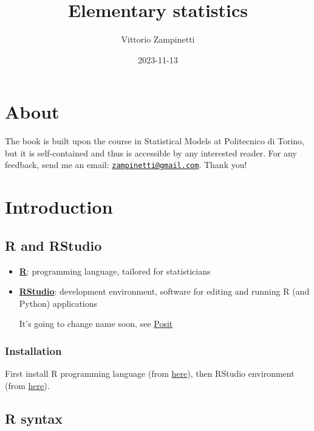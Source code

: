 \documentclass[
  oneside]{book}
\title{Elementary statistics}
\author{Vittorio Zampinetti}
\date{2023-11-13}
\begin{document}
\maketitle

{
\setcounter{tocdepth}{2}
\tableofcontents
}
\hypertarget{about}{%
\chapter*{About}\label{about}}

The book is built upon the course in Statistical Models at
Politecnico di Torino, but it is self-contained and thus is
accessible by any interested reader. For any feedback, send me
an email: \href{mailto:zampinetti@gmail.com}{\nolinkurl{zampinetti@gmail.com}}. Thank you!

\hypertarget{introduction}{%
\chapter{Introduction}\label{introduction}}

\hypertarget{r-and-rstudio}{%
\section{R and RStudio}\label{r-and-rstudio}}

\begin{itemize}
\item
  \href{https://www.r-project.org/}{\textbf{R}}: programming language, tailored for
  statisticians
\item
  \href{https://www.rstudio.com/}{\textbf{RStudio}}: development environment, software for
  editing and running R (and Python) applications

  It's going to change name soon, see \href{https://posit.co/}{Posit}
\end{itemize}

\hypertarget{installation}{%
\subsection{Installation}\label{installation}}

First install R programming language (from \href{https://cran.rstudio.com/}{here}),
then RStudio environment (from
\href{https://www.rstudio.com/products/rstudio/download/\#download}{here}).

\hypertarget{r-syntax}{%
\section{R syntax}\label{r-syntax}}
\end{document}

